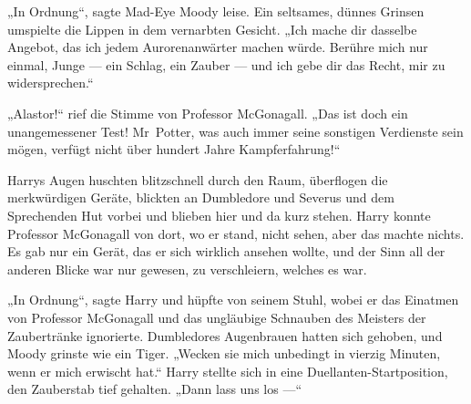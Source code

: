 „In Ordnung“, sagte Mad-Eye Moody leise. Ein seltsames, dünnes Grinsen umspielte die Lippen in dem vernarbten Gesicht.
„Ich mache dir dasselbe Angebot, das ich jedem Aurorenanwärter machen würde. Berühre mich nur einmal, Junge — ein Schlag, ein Zauber — und ich gebe dir das Recht, mir zu widersprechen.“

„Alastor!“ rief die Stimme von Professor McGonagall.
„Das ist doch ein unangemessener Test! Mr~Potter, was auch immer seine sonstigen Verdienste sein mögen, verfügt nicht über hundert Jahre Kampferfahrung!“

Harrys Augen huschten blitzschnell durch den Raum, überflogen die merkwürdigen Geräte, blickten an Dumbledore und Severus und dem Sprechenden Hut vorbei und blieben hier und da kurz stehen. Harry konnte Professor McGonagall von dort, wo er stand, nicht sehen, aber das machte nichts. Es gab nur ein Gerät, das er sich wirklich ansehen wollte, und der Sinn all der anderen Blicke war nur gewesen, zu verschleiern, welches es war.

„In Ordnung“, sagte Harry und hüpfte von seinem Stuhl, wobei er das Einatmen von Professor McGonagall und das ungläubige Schnauben des Meisters der Zaubertränke ignorierte. Dumbledores Augenbrauen hatten sich gehoben, und Moody grinste wie ein Tiger.
„Wecken sie mich unbedingt in vierzig Minuten, wenn er mich erwischt hat.“
Harry stellte sich in eine Duellanten-Startposition, den Zauberstab tief gehalten.
„Dann lass uns los —“

